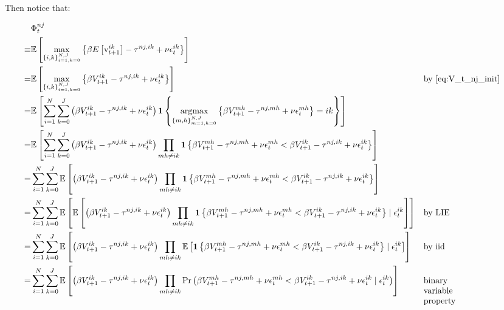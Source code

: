\documentclass[10pt]{article}
\begin{document}
Then notice that:

\begin{align}
    &\Phi_t^{n j} \\
    \equiv &\mathbb{E}\left[\max _{\{i, k\}_{i=1, k=0}^{N, J}}\left\{\beta E\left[\mathrm{v}_{t+1}^{i k}\right]-\tau^{n j, i k}+\nu \epsilon_t^{i k}\right\}\right] \\
    = &\mathbb{E}\left[\max _{\{i, k\}_{i=1, k=0}^{N, J}} \left\{ \beta V_{t+1}^{i k}-\tau^{n j, i k}+\nu \epsilon_t^{i k} \right\}\right] && \text{by \eqref{eq:V_t_nj_init}} \\
    = &\mathbb{E}\left[ \sum_{i = 1}^N \sum_{k = 0}^J \left(\beta V_{t+1}^{i k}-\tau^{n j, i k}+\nu \epsilon_t^{i k}\right) \mathbf{1}\left\{ \underset{{\{m, h\}_{m=1, h=0}^{N, J}}}{\text{argmax}} \left\{ \beta V_{t+1}^{m h}-\tau^{n j, m h}+\nu \epsilon_t^{m h} \right\} = i k \right\} \right] \\
    = &\mathbb{E}\left[ \sum_{i = 1}^N \sum_{k = 0}^J \left(\beta V_{t+1}^{i k}-\tau^{n j, i k}+\nu \epsilon_t^{i k}\right) \prod_{m h \neq i k} \mathbf{1}\left\{ \beta V_{t+1}^{m h}-\tau^{n j, m h}+\nu \epsilon_t^{m h} < \beta V_{t+1}^{i k}-\tau^{n j, i k}+\nu \epsilon_t^{i k} \right\} \right] \\
    = &\sum_{i=1}^N \sum_{k=0}^J \mathbb{E}\left[ \left(\beta V_{t+1}^{i k}-\tau^{n j, i k}+\nu \epsilon_t^{i k}\right) \prod_{m h \neq i k} \mathbf{1}\left\{ \beta V_{t+1}^{m h}-\tau^{n j, m h}+\nu \epsilon_t^{m h} < \beta V_{t+1}^{i k}-\tau^{n j, i k}+\nu \epsilon_t^{i k} \right\} \right] \\
    = &\sum_{i=1}^N \sum_{k=0}^J \mathbb{E}\left[ \mathbb{E} \left[ \left(\beta V_{t+1}^{i k}-\tau^{n j, i k}+\nu \epsilon_t^{i k}\right) \prod_{m h \neq i k} \mathbf{1}\left\{ \beta V_{t+1}^{m h}-\tau^{n j, m h}+\nu \epsilon_t^{m h} < \beta V_{t+1}^{i k}-\tau^{n j, i k}+\nu \epsilon_t^{i k} \right\} \mid \epsilon_t^{i k} \right] \right] && \text{by LIE} \\
    = &\sum_{i=1}^N \sum_{k=0}^J \mathbb{E}\left[ \left(\beta V_{t+1}^{i k}-\tau^{n j, i k}+\nu \epsilon_t^{i k}\right) \prod_{m h \neq i k} \mathbb{E} \left[ \mathbf{1}\left\{ \beta V_{t+1}^{m h}-\tau^{n j, m h}+\nu \epsilon_t^{m h} < \beta V_{t+1}^{i k}-\tau^{n j, i k}+\nu \epsilon_t^{i k} \right\} \mid \epsilon_t^{i k} \right] \right]  && \text{by iid}\\
    = &\sum_{i=1}^N \sum_{k=0}^J \mathbb{E}\left[ \left(\beta V_{t+1}^{i k}-\tau^{n j, i k}+\nu \epsilon_t^{i k}\right) \prod_{m h \neq i k} \Pr \left(\beta V_{t+1}^{m h}-\tau^{n j, m h}+\nu \epsilon_t^{m h} < \beta V_{t+1}^{i k}-\tau^{n j, i k}+\nu \epsilon_t^{i k} \mid \epsilon_t^{i k} \right) \right] && \parbox[t]{1.5cm}{\raggedright binary variable property}
\end{align}
\end{document}

